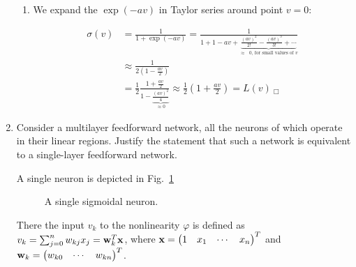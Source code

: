\begin{enumerate}
\begin{solution}
\begin{enumerate}
    \item We expand the $\exp(-av)$ in Taylor series around point $v=0$:
      
      \begin{equation}
        \begin{split}
          \sigma(v) &= \frac{1}{1 + \exp(-av)} = \frac{1}{1 + 1 - av +
            \underbrace{\frac{(av)^2}{2!} - \frac{(av)^3}{3!} +
              \cdots}_{\mbox{$\approx$ $0$, for small values of $v$}}} \\ 
          &\approx \frac{1}{2 ( 1 - \frac{av}{2})} \\
          &= \frac{1}{2} \frac{1 + \frac{av}{2}} {1 -
            \underbrace{\frac{(av)^2}{4}}_{\approx 0}} \approx \frac{1}{2}
          \left(1 + \frac{av}{2} \right) = L(v) \: _\Box
        \end{split}
      \end{equation}
      
    \end{enumerate}

  \end{solution}
  

\item

  Consider a multilayer feedforward network, all the neurons of which
  operate in their linear regions. Justify the statement that such a
  network is equivalent to a single-layer feedforward network.

  \begin{solution}
    A single neuron is depicted in Fig.~\ref{fig:singleneuron}


    \begin{figure}[hb]
      \begin{center}
        
        \caption{\label{fig:singleneuron} A single sigmoidal neuron.}
      \end{center}
    \end{figure}
    
    There the input $v_k$ to the nonlinearity $\varphi$ is defined as
    $v_k = \sum_{j = 0}^n w_{kj}x_j = {\bf{w}}_k^T {\bf{x}}$, \newline
    where ${\bf{x}}=\begin{pmatrix} 1 & x_1 &\cdots & x_n
    \end{pmatrix}^T$ and ${\bf{w}}_k=\begin{pmatrix} w_{k0} &\cdots &
      w_{kn} \end{pmatrix}^T$.


\end{solution}
\end{enumerate}
